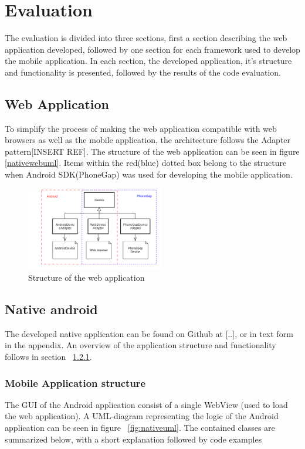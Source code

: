 \chapter{Evaluation}	
The evaluation is divided into three sections, first a section describing the web application developed, followed by one section for each framework used to develop the mobile application. In each section, the developed application, it's structure and functionality is presented, followed by the results of the code evaluation. 

\section{Web Application}
To simplify the process of making the web application compatible with web browsers as well as the mobile application, the architecture follows the Adapter pattern[INSERT REF]. The structure of the web application can be seen in figure \ref{nativewebuml}. Items within the red(blue) dotted box belong to the structure when Android SDK(PhoneGap) was used for developing the mobile application.

\begin{figure}[h!]
	\centering
    \includegraphics[width=60mm,natwidth=400,natheight=300]{./img/webuml.png}
    \caption{Structure of the web application}
	\label{fig:webuml}
\end{figure}

\section{Native android} \label{android}
The developed native application can be found on Github at [..], or in text form in the appendix. An overview of the application structure and functionality follows in section ~\ref{sec:nativestructure}. 

\subsection{Mobile Application structure} \label{sec:nativestructure}
The GUI of the Android application consist of a single WebView (used to load the web application). A UML-diagram representing the logic of the Android application can be seen in figure ~\ref{fig:nativeuml}. The contained classes are summarized below, with a short explanation followed by code examples 


